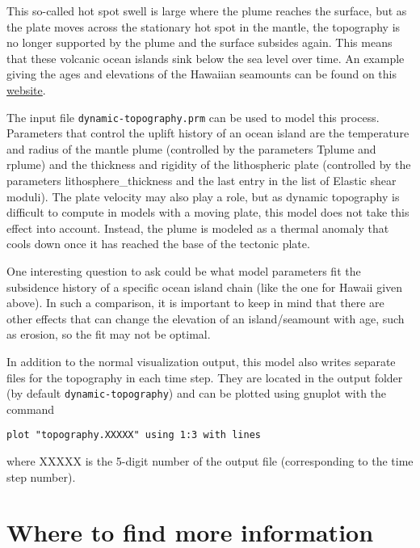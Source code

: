\documentclass[notitlepage]{article}
\begin{document}
This so-called hot spot swell is large where the plume reaches the surface, but as the plate moves across the 
stationary hot spot in the mantle, the topography is no longer supported by the plume and the surface subsides again. 
This means that these volcanic ocean islands sink below the sea level over time. An example giving the ages and 
elevations of the Hawaiian seamounts can be found on this \href{https://www.mtholyoke.edu/courses/mdyar/ast106/earth_hw_a.html}{website}.

The input file \texttt{dynamic-topography.prm} can be used to model this process. Parameters that control
the uplift history of an ocean island are the temperature and radius of the mantle plume (controlled by the parameters 
Tplume and rplume) and the thickness and rigidity of the lithospheric plate (controlled by the parameters 
lithosphere\_thickness and the last entry in the list of Elastic shear moduli). 
The plate velocity may also play a role, but as dynamic topography is difficult to compute in models with a moving plate, 
this model does not take this effect into account. Instead, the plume is modeled as a thermal anomaly that cools down once it has reached the base of the tectonic plate. 

One interesting question to ask could be what model parameters fit the subsidence
history of a specific ocean island chain (like the one for Hawaii given above). 
In such a comparison, it is important to keep in mind that there are other effects that can change the elevation of an island/seamount with age, such as erosion, so the fit may not be optimal. 

In addition to the normal visualization output, this model also writes separate files for the topography in each time step. 
They are located in the output folder (by default \texttt{dynamic-topography}) and can be plotted using gnuplot with the command
\begin{verbatim}
plot "topography.XXXXX" using 1:3 with lines
\end{verbatim} 
where XXXXX is the 5-digit number of the output file (corresponding to the time step number). 

\section{Where to find more information}
\end{document}

